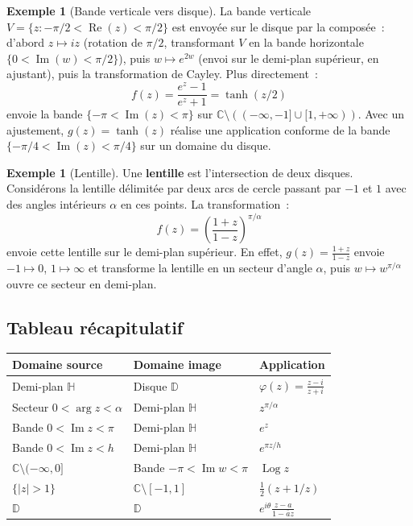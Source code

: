 \documentclass[12pt,a4paper,openany]{book}
\theoremstyle{definition}
\newtheorem{exemple}[definition]{Exemple}
\theoremstyle{plain}
\theoremstyle{remark}
\newcommand{\C}{\mathbb{C}}
\newcommand{\D}{\mathbb{D}}
\DeclareMathOperator{\re}{Re}
\DeclareMathOperator{\im}{Im}
\DeclareMathOperator{\Log}{Log}
\newcommand{\abs}[1]{\left|#1\right|}
\newcommand{\conj}[1]{\overline{#1}}
\begin{document}
\begin{exemple}[Bande verticale vers disque]\label{ex:bande-disque}
La bande verticale $V = \{z : -\pi/2 < \re(z) < \pi/2\}$ est envoyée sur le disque par
la composée~: d'abord $z \mapsto iz$ (rotation de $\pi/2$, transformant $V$ en la bande
horizontale $\{0 < \im(w) < \pi/2\}$), puis $w \mapsto e^{2w}$ (envoi sur le
demi-plan supérieur, en ajustant), puis la transformation de Cayley. Plus directement~:
\[
  f(z) = \frac{e^z - 1}{e^z + 1} = \tanh(z/2)
\]
envoie la bande $\{-\pi < \im(z) < \pi\}$ sur $\C \setminus ((-\infty, -1] \cup [1, +\infty))$.
Avec un ajustement, $g(z) = \tanh(z)$ réalise une application conforme de la bande
$\{-\pi/4 < \im(z) < \pi/4\}$ sur un domaine du disque.
\end{exemple}

\begin{exemple}[Lentille]\label{ex:lentille}
Une \textbf{lentille} est l'intersection de deux disques. Considérons la lentille
délimitée par deux arcs de cercle passant par $-1$ et $1$ avec des angles intérieurs
$\alpha$ en ces points. La transformation~:
\[
  f(z) = \left(\frac{1+z}{1-z}\right)^{\pi/\alpha}
\]
envoie cette lentille sur le demi-plan supérieur. En effet, $g(z) = \frac{1+z}{1-z}$
envoie $-1 \mapsto 0$, $1 \mapsto \infty$ et transforme la lentille en un secteur
d'angle $\alpha$, puis $w \mapsto w^{\pi/\alpha}$ ouvre ce secteur en demi-plan.
\end{exemple}

\subsection{Tableau récapitulatif}

\begin{center}
\renewcommand{\arraystretch}{1.6}
\begin{tabular}{lll}
\toprule
\textbf{Domaine source} & \textbf{Domaine image} & \textbf{Application} \\
\midrule
Demi-plan $\mathbb{H}$ & Disque $\D$ & $\varphi(z) = \frac{z-i}{z+i}$ \\[4pt]
Secteur $0 < \arg z < \alpha$ & Demi-plan $\mathbb{H}$ & $z^{\pi/\alpha}$ \\[4pt]
Bande $0 < \im z < \pi$ & Demi-plan $\mathbb{H}$ & $e^z$ \\[4pt]
Bande $0 < \im z < h$ & Demi-plan $\mathbb{H}$ & $e^{\pi z/h}$ \\[4pt]
$\C \setminus (-\infty, 0]$ & Bande $-\pi < \im w < \pi$ & $\Log z$ \\[4pt]
$\{\abs{z} > 1\}$ & $\C \setminus [-1,1]$ & $\frac{1}{2}(z+1/z)$ \\[4pt]
$\D$ & $\D$ & $e^{i\theta}\frac{z-a}{1-\conj{a}z}$ \\
\bottomrule
\end{tabular}
\end{center}
\end{document}
